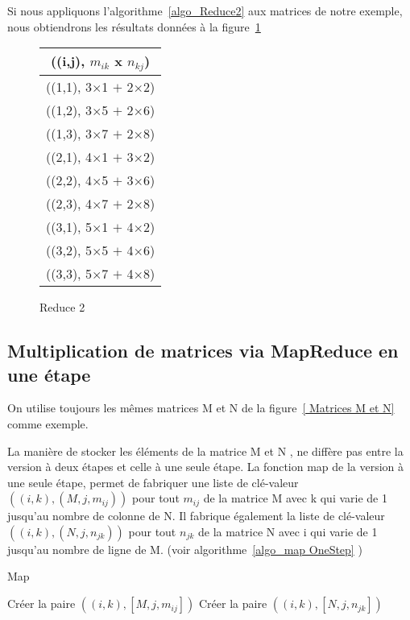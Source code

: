 Si nous appliquons l'algorithme~\ref{algo_Reduce2} aux matrices de notre exemple, nous obtiendrons les résultats données à la figure~\ref{reduce2}

\begin{figure}[H]
  \begin{center}
    \begin{tabular}{|c|}
      \hline
	  ((i,j), $m_{ik}$ x $n_{kj}$) \\
      \hline
      ((1,1), 3$\times$1 $+$ 2$\times$2) \\
      ((1,2), 3$\times$5 $+$ 2$\times$6) \\
      ((1,3), 3$\times$7 $+$ 2$\times$8) \\
      ((2,1), 4$\times$1 $+$ 3$\times$2) \\
      ((2,2), 4$\times$5 $+$ 3$\times$6) \\
      ((2,3), 4$\times$7 $+$ 2$\times$8) \\
      ((3,1), 5$\times$1 $+$ 4$\times$2) \\
      ((3,2), 5$\times$5 $+$ 4$\times$6) \\
      ((3,3), 5$\times$7 $+$ 4$\times$8) \\             
      \hline
    \end{tabular}
    \caption{Reduce 2}
    \label{reduce2}
  \end{center}
\end{figure}

\subsection{Multiplication de matrices via MapReduce en une étape}

On utilise toujours les mêmes matrices M et N de la figure~\ref{ Matrices M et N} comme exemple.\par 
La manière de stocker les éléments de la matrice M et N , ne diffère pas entre la version à deux étapes et celle à une seule étape. 
La fonction map de la version à une seule étape, permet de fabriquer une liste de clé-valeur $((i,k),(M,j,m_{ij}))$
pour tout $m_{ij}$ de la matrice M  avec k qui varie de 1 jusqu'au nombre de colonne de N. Il fabrique également la liste de clé-valeur $((i,k),(N,j,n_{jk}))$
pour tout $n_{jk}$ de la matrice N avec i qui varie de  1 jusqu'au nombre de ligne de M. (voir algorithme~\ref{algo_map OneStep} )
\begin{algorithm}[H]
  \caption{Map}
  \label{algo_map OneStep}
  \begin{algorithmic}
    \State {}
    \State Cr\'{e}er la paire $((i,k),[M,j,m_{ij}])$
    \EndFor
    \EndFor
	\State {}
    \State Cr\'{e}er la paire $((i,k),[N,j,n_{jk}])$
    \EndFor
    \EndFor
  \end{algorithmic}
\end{algorithm}

